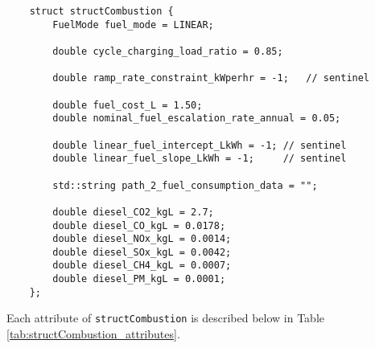 \documentclass[12pt, letterpaper]{report}
\begin{document}
\begin{verbatim}
    struct structCombustion {
        FuelMode fuel_mode = LINEAR;

        double cycle_charging_load_ratio = 0.85;

        double ramp_rate_constraint_kWperhr = -1;   // sentinel
        
        double fuel_cost_L = 1.50;
        double nominal_fuel_escalation_rate_annual = 0.05;

        double linear_fuel_intercept_LkWh = -1; // sentinel
        double linear_fuel_slope_LkWh = -1;     // sentinel
        
        std::string path_2_fuel_consumption_data = "";
        
        double diesel_CO2_kgL = 2.7;
        double diesel_CO_kgL = 0.0178;
        double diesel_NOx_kgL = 0.0014;
        double diesel_SOx_kgL = 0.0042;
        double diesel_CH4_kgL = 0.0007;
        double diesel_PM_kgL = 0.0001;
    };
\end{verbatim}

\noindent Each attribute of \texttt{structCombustion} is described below in Table \ref{tab:structCombustion_attributes}.
\end{document}
